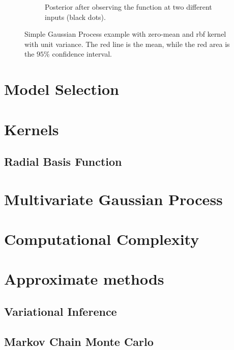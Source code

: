 \begin{figure}[h]
\begin{subfigure}{0.49\textwidth}
        \caption{Posterior after observing the function at two different inputs (black dots).}
        \label{fig:gp_posterior}
    \end{subfigure}
    \caption{Simple Gaussian Process example with zero-mean and \acrshort{rbf} kernel with unit variance. The red line is the mean, while the red area is the $95\%$ confidence interval.}
\end{figure}

\section{Model Selection}
\section{Kernels}\label{sec:kernels}

\subsection{Radial Basis Function}\label{sec:kernels_rbf}
\section{Multivariate Gaussian Process}
\section{Computational Complexity}
\section{Approximate methods}
\subsection{Variational Inference}
\subsection{Markov Chain Monte Carlo}
